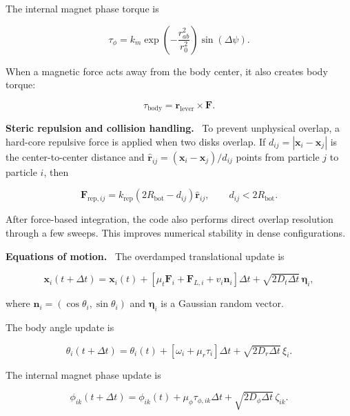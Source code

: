 \documentclass[12pt,a4paper,oneside]{report}
\newcommand{\runin}[1]{\vspace{0.45em}\noindent\textbf{#1.}\ }
\begin{document}
The internal magnet phase torque is

\begin{equation}
\tau_{\phi} =
k_m
\exp\left(-\frac{r_{ab}^2}{r_0^2}\right)
\sin(\Delta\psi).
\end{equation}

When a magnetic force acts away from the body center, it also creates body torque:

\begin{equation}
\tau_{\mathrm{body}} = \mathbf{r}_{\mathrm{lever}}\times\mathbf{F}.
\end{equation}

\runin{Steric repulsion and collision handling}
To prevent unphysical overlap, a hard-core repulsive force is applied when two disks overlap. If $d_{ij}=|\mathbf{x}_i-\mathbf{x}_j|$ is the center-to-center distance and $\hat{\mathbf{r}}_{ij}=(\mathbf{x}_i-\mathbf{x}_j)/d_{ij}$ points from particle $j$ to particle $i$, then

\begin{equation}
\mathbf{F}_{\mathrm{rep},ij} =
k_{\mathrm{rep}}(2R_{\mathrm{bot}}-d_{ij})\hat{\mathbf{r}}_{ij},
\qquad d_{ij}<2R_{\mathrm{bot}}.
\end{equation}

After force-based integration, the code also performs direct overlap resolution through a few sweeps. This improves numerical stability in dense configurations.

\runin{Equations of motion}
The overdamped translational update is

\begin{equation}
\mathbf{x}_i(t+\Delta t) =
\mathbf{x}_i(t)
+
\left[
\mu_t\mathbf{F}_i
+\mathbf{F}_{L,i}
+v_i\mathbf{n}_i
\right]\Delta t
+\sqrt{2D_t\Delta t}\,\bm{\eta}_i,
\end{equation}

where $\mathbf{n}_i=(\cos\theta_i,\sin\theta_i)$ and $\bm{\eta}_i$ is a Gaussian random vector.

The body angle update is

\begin{equation}
\theta_i(t+\Delta t) =
\theta_i(t) +
\left[
\omega_i+\mu_r\tau_i
\right]\Delta t
+\sqrt{2D_r\Delta t}\,\xi_i.
\end{equation}

The internal magnet phase update is

\begin{equation}
\phi_{ik}(t+\Delta t) =
\phi_{ik}(t)+\mu_\phi \tau_{\phi,ik}\Delta t
+\sqrt{2D_\phi\Delta t}\,\zeta_{ik}.
\end{equation}
\end{document}
